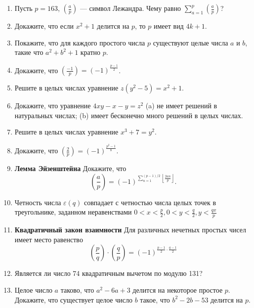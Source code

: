 \documentclass{article}
\begin{document}
\begin{enumerate}[label*=\protect\fbox{\arabic{enumi}}]

\item Пусть $p = 163$, $\left(\frac{a}{p}\right)$ — символ Лежандра. Чему равно $\sum\limits_{a = 1}^p\left(\frac{a}{p}\right)$?

\item Докажите, что если $x^2 + 1$ делится на $p$, то $p$ имеет вид $4k + 1$.

\item Покажите, что для каждого простого числа $ p $ существуют целые числа $ a $ и $ b $, такие что $ a^2 + b^2 +1 $ кратно $ p $.

\item Докажите, что $\left(\frac{-1}{p}\right) = (-1)^{\frac{p - 1}{2}}$.

\item Решите в целых числах уравнение $z(y^2 - 5) = x^2 + 1$.

\item Докажите, что уравнение $4xy - x - y = z^2$ (a) не имеет решений в натуральных числах; (b) имеет бесконечно много решений в целых числах.

\item Решите в целых числах уравнение $x^3 + 7 = y^2$.



\item Докажите, что $\left(\frac{2}{p}\right) = (-1)^{\frac{p^2 - 1}{8}}$.

\item \textbf{Лемма Эйзенштейна} Докажите, что $$\left(\frac{a}{p}\right) = (-1)^{\sum\limits_{n=1}^{(p-1)/2}\left\lfloor\frac{2an}{p}\right\rfloor}.$$

\item Четность числа $\varepsilon(q)$ совпадает с четностью числа целых точек в треугольнике, заданном неравенствами $0 < x<\frac{p}{2} , 0 < y < \frac{q}{2}, y < \frac{qx}{p}$

\item \textbf{Квадратичный закон взаимности} Для различных нечетных простых чисел имеет место равенство $$\left(\frac{p}{q}\right) \cdot \left(\frac{q}{p}\right) = (-1)^{\frac{p-1}{2}\cdot\frac{q-1}{2}}$$

\item Является ли число 74 квадратичным вычетом по модулю 131?

\item Целое число $a$ таково, что $a^2 - 6a + 3$ делится на некоторое простое $p$. Докажите, что
существует целое число $b$ такое, что $b^2 - 2b - 53$ делится на $p$.


\end{enumerate}
\end{document}
